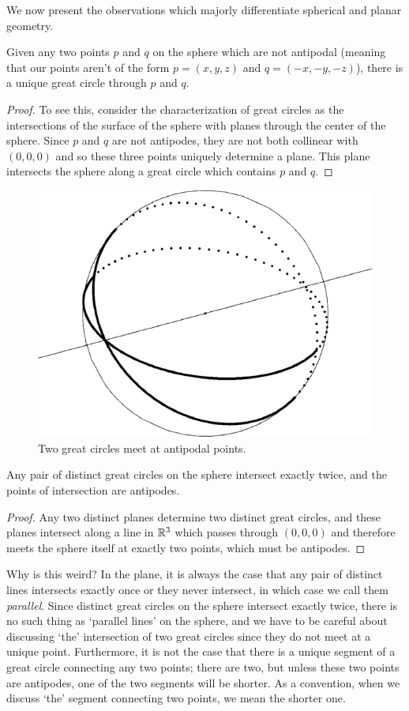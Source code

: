 We now present the observations which majorly differentiate spherical and planar geometry.

\begin{claim}
	Given any two points $p$ and $q$ on the sphere which are not antipodal (meaning that our points aren't of the form $p=(x,y,z)$ and $q=(-x,-y,-z)$), there is a unique great circle through $p$ and $q$. 
\end{claim}
\begin{proof}
To see this, consider the characterization of great circles as the intersections of the surface of the sphere with planes through the center of the sphere.  Since $p$ and $q$ are not antipodes, they are not both collinear with $(0,0,0)$ and so these three points uniquely determine a plane.  This plane intersects the sphere along a great circle which contains $p$ and $q$.
\end{proof}

\begin{figure}[htb]
	\centering
	\includegraphics[width=.35\textwidth]{figs/2gc.pdf}
	\caption{Two great circles meet at antipodal points.}
	\label{fig:2gc}
\end{figure}


\begin{claim}
	Any pair of distinct great circles on the sphere intersect exactly twice, and the points of intersection are antipodes.
\end{claim}
\begin{proof}
Any two distinct planes determine two distinct great circles, and these planes intersect along a line in $\mathbb{R}^3$ which passes through $(0,0,0)$ and therefore meets the sphere itself at exactly two points, which must be antipodes.
\end{proof}

Why is this weird? In the plane, it is always the case that any pair of distinct lines intersects exactly once or they never intersect, in which case we call them \textit{parallel}. Since distinct great circles on the sphere intersect exactly twice, there is no such thing as `parallel lines' on the sphere, and we have to be careful about discussing `the' intersection of two great circles since they do not meet at a unique point.  Furthermore, it is not the case that there is a unique segment of a great circle connecting any two points; there are two, but unless these two points are antipodes, one of the two segments will be shorter.  As a convention, when we discuss `the' segment connecting two points, we mean the shorter one.  

